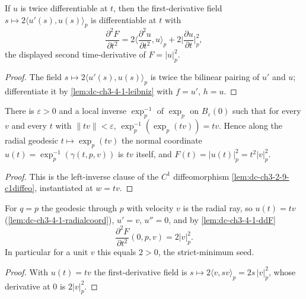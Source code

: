 \begin{lemma}
  \label{lem:dc-ch3-4-1-ddF}
  \leanok
  If $u$ is twice differentiable at $t$, then the first-derivative field
  $s\mapsto 2\langle u'(s),u(s)\rangle_p$ is differentiable at $t$ with
  $$\frac{\partial^2 F}{\partial t^2}
    = 2\Big\langle\frac{\partial^2 u}{\partial t^2},u\Big\rangle_p
      + 2\Big|\frac{\partial u}{\partial t}\Big|_p^2,$$
  the displayed second time-derivative of $F=|u|_p^2$.
\end{lemma}
\begin{proof}
  \sketch
  \leanok
  The field $s\mapsto 2\langle u'(s),u(s)\rangle_p$ is twice the bilinear pairing
  of $u'$ and $u$; differentiate it by \cref{lem:dc-ch3-4-1-leibniz} with
  $f=u'$, $h=u$.
\end{proof}

\begin{lemma}
  \label{lem:dc-ch3-4-1-radialcoord}
  \leanok
  There is $\varepsilon>0$ and a local inverse $\exp_p^{-1}$ of $\exp_p$ on
  $B_\varepsilon(0)$ such that for every $v$ and every $t$ with
  $\|tv\|<\varepsilon$, $\exp_p^{-1}(\exp_p(tv))=tv$. Hence along the radial
  geodesic $t\mapsto\exp_p(tv)$ the normal coordinate $u(t)=\exp_p^{-1}(\gamma(t,p,v))$
  is $tv$ itself, and $F(t)=|u(t)|_p^2=t^2|v|_p^2$.
\end{lemma}
\begin{proof}
  \sketch
  \leanok
  This is the left-inverse clause of the $C^1$ diffeomorphism
  \cref{lem:dc-ch3-2-9-c1diffeo}, instantiated at $w=tv$.
\end{proof}

\begin{lemma}[center Hessian: $\partial^2 F/\partial t^2(0,p,v)=2|v|^2$]
  \label{lem:dc-ch3-4-1-hessian-center}
  \leanok
  For $q=p$ the geodesic through $p$ with velocity $v$ is the radial ray, so
  $u(t)=tv$ (\cref{lem:dc-ch3-4-1-radialcoord}), $u'=v$, $u''=0$, and by
  \cref{lem:dc-ch3-4-1-ddF}
  $$\frac{\partial^2 F}{\partial t^2}(0,p,v)=2|v|_p^2.$$
  In particular for a unit $v$ this equals $2>0$, the strict-minimum seed.
\end{lemma}
\begin{proof}
  \sketch
  \leanok
  With $u(t)=tv$ the first-derivative field is
  $s\mapsto 2\langle v,sv\rangle_p=2s\,|v|_p^2$, whose derivative at $0$ is
  $2|v|_p^2$.
\end{proof}

